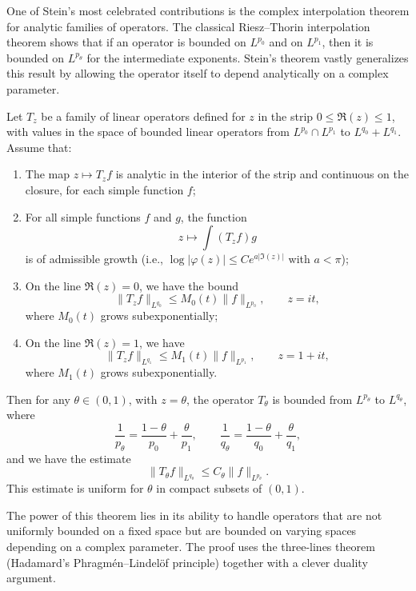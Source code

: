 One of Stein's most celebrated contributions is the complex interpolation theorem for analytic families of operators. The classical Riesz--Thorin interpolation theorem shows that if an operator is bounded on \(L^{p_0}\) and on \(L^{p_1}\), then it is bounded on \(L^{p_\theta}\) for the intermediate exponents. Stein's theorem vastly generalizes this result by allowing the operator itself to depend analytically on a complex parameter.

\begin{theorem}
Let \(T_z\) be a family of linear operators defined for \(z\) in the strip \(0 \leq \Re(z) \leq 1\), with values in the space of bounded linear operators from \(L^{p_0} \cap L^{p_1}\) to \(L^{q_0} + L^{q_1}\). Assume that:
\begin{enumerate}
    \item The map \(z \mapsto T_z f\) is analytic in the interior of the strip and continuous on the closure, for each simple function \(f\);
    \item For all simple functions \(f\) and \(g\), the function
    \[
    z \mapsto \int (T_z f) g
    \]
    is of admissible growth (i.e., \(\log |\varphi(z)| \leq Ce^{a|\Im(z)|}\) with \(a < \pi\));
    \item On the line \(\Re(z) = 0\), we have the bound
    \[
    \|T_z f\|_{L^{q_0}} \leq M_0(t) \|f\|_{L^{p_0}}, \qquad z = it,
    \]
    where \(M_0(t)\) grows subexponentially;
    \item On the line \(\Re(z) = 1\), we have
    \[
    \|T_z f\|_{L^{q_1}} \leq M_1(t) \|f\|_{L^{p_1}}, \qquad z = 1 + it,
    \]
    where \(M_1(t)\) grows subexponentially.
\end{enumerate}
Then for any \(\theta \in (0,1)\), with \(z = \theta\), the operator \(T_\theta\) is bounded from \(L^{p_\theta}\) to \(L^{q_\theta}\), where
\[
\frac{1}{p_\theta} = \frac{1-\theta}{p_0} + \frac{\theta}{p_1}, \qquad
\frac{1}{q_\theta} = \frac{1-\theta}{q_0} + \frac{\theta}{q_1},
\]
and we have the estimate
\[
\|T_\theta f\|_{L^{q_\theta}} \leq C_\theta \|f\|_{L^{p_\theta}}.
\]
This estimate is uniform for \(\theta\) in compact subsets of \((0,1)\).
\end{theorem}

The power of this theorem lies in its ability to handle operators that are not uniformly bounded on a fixed space but are bounded on varying spaces depending on a complex parameter. The proof uses the three-lines theorem (Hadamard's Phragm\'en--Lindel\"of principle) together with a clever duality argument.

